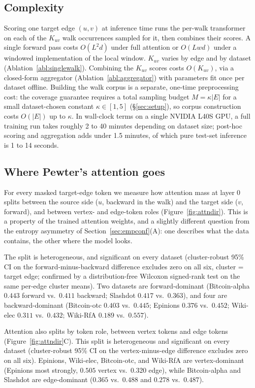 \documentclass[sigconf, review, anonymous]{acmart}
\theoremstyle{plain}
\theoremstyle{definition}
\begin{document}
\subsection{Complexity}
\label{sec:complexity}
Scoring one target edge $(u,v)$ at inference time runs the per-walk transformer on each of the $K_{uv}$ walk occurrences sampled for it, then combines their scores. A single forward pass costs $O(L^2d)$ under full attention or $O(Lwd)$ under a windowed implementation of the local window. $K_{uv}$ varies by edge and by dataset (Ablation~\ref{abl:singlewalk}). Combining the $K_{uv}$ scores costs $O(K_{uv})$, via a closed-form aggregator (Ablation~\ref{abl:aggregator}) with parameters fit once per dataset offline. Building the walk corpus is a separate, one-time preprocessing cost: the coverage guarantee requires a total sampling budget $M=\kappa|E|$ for a small dataset-chosen constant $\kappa\in[1,5]$ (\S\ref{sec:setup}), so corpus construction costs $O(|E|)$ up to $\kappa$. In wall-clock terms on a single NVIDIA L40S GPU, a full training run takes roughly 2 to 40 minutes depending on dataset size; post-hoc scoring and aggregation adds under 1.5 minutes, of which pure test-set inference is 1 to 14 seconds.

\subsection{Where Pewter's attention goes}
For every masked target-edge token we measure how attention mass at layer 0 splits between the source side ($u$, backward in the walk) and the target side ($v$, forward), and between vertex- and edge-token roles (Figure~\ref{fig:attndir}). This is a property of the trained attention weights, and a slightly different question from the entropy asymmetry of Section~\ref{sec:empconf}(A): one describes what the data contains, the other where the model looks. 

The split is heterogeneous, and significant on every dataset (cluster-robust 95\% CI on the forward-minus-backward difference excludes zero on all six, cluster = target edge; confirmed by a distribution-free Wilcoxon signed-rank test on the same per-edge cluster means). Two datasets are forward-dominant (Bitcoin-alpha $0.443$ forward vs.\ $0.411$ backward; Slashdot $0.417$ vs.\ $0.363$), and four are backward-dominant (Bitcoin-otc $0.403$ vs.\ $0.445$; Epinions $0.376$ vs.\ $0.452$; Wiki-elec $0.311$ vs.\ $0.432$; Wiki-RfA $0.189$ vs.\ $0.557$). 

Attention also splits by token role, between vertex tokens and edge tokens (Figure~\ref{fig:attndir}C). This split is heterogeneous and significant on every dataset (cluster-robust 95\% CI on the vertex-minus-edge difference excludes zero on all six). Epinions, Wiki-elec, Bitcoin-otc, and Wiki-RfA are vertex-dominant (Epinions most strongly, $0.505$ vertex vs.\ $0.320$ edge), while Bitcoin-alpha and Slashdot are edge-dominant ($0.365$ vs.\ $0.488$ and $0.278$ vs.\ $0.487$).
\end{document}
